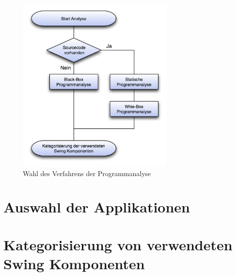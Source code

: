   \begin{figure}[ht]
    \begin{center}
      \includegraphics[width=0.7\textwidth]{./image/guiAnalyse.png}
      \caption{Wahl des Verfahrens der Programmanalyse}
      \label{img:guiAnalyse}
    \end{center}
  \end{figure}
  
  \section{Auswahl der Applikationen}
  
  \section{Kategorisierung von verwendeten Swing Komponenten}